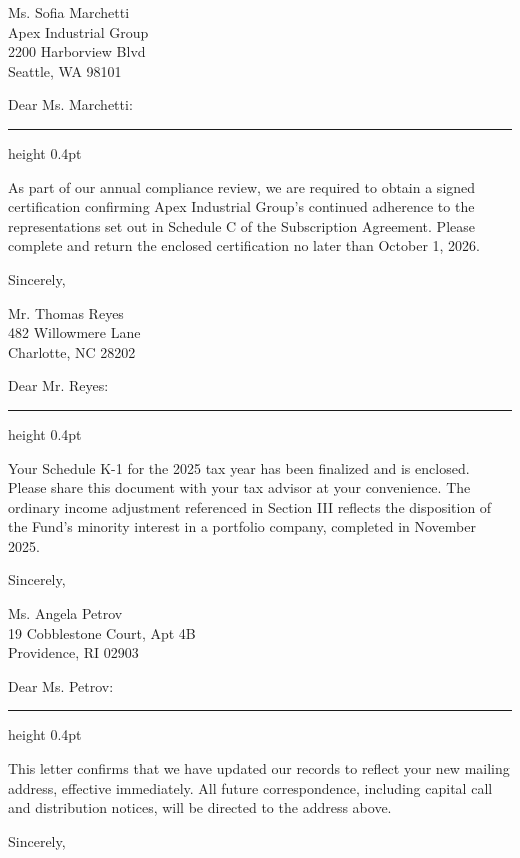 \documentclass[11pt]{letter}
\begin{document}
\begin{letter}{Ms. Sofia Marchetti\\
  Apex Industrial Group\\
  2200 Harborview Blvd\\
  Seattle, WA 98101}

\opening{Dear Ms. Marchetti:}
\vspace{-0.4\baselineskip}
{\color{hairline}\hrule height 0.4pt}
\vspace{0.6\baselineskip}

As part of our annual compliance review, we are required to obtain a signed certification confirming Apex Industrial Group's continued adherence to the representations set out in Schedule C of the Subscription Agreement. Please complete and return the enclosed certification no later than October 1, 2026.

\closing{Sincerely,}
\end{letter}

\begin{letter}{Mr. Thomas Reyes\\
  482 Willowmere Lane\\
  Charlotte, NC 28202}

\opening{Dear Mr. Reyes:}
\vspace{-0.4\baselineskip}
{\color{hairline}\hrule height 0.4pt}
\vspace{0.6\baselineskip}

Your Schedule K-1 for the 2025 tax year has been finalized and is enclosed. Please share this document with your tax advisor at your convenience. The ordinary income adjustment referenced in Section III reflects the disposition of the Fund's minority interest in a portfolio company, completed in November 2025.

\closing{Sincerely,}
\end{letter}

\begin{letter}{Ms. Angela Petrov\\
  19 Cobblestone Court, Apt 4B\\
  Providence, RI 02903}

\opening{Dear Ms. Petrov:}
\vspace{-0.4\baselineskip}
{\color{hairline}\hrule height 0.4pt}
\vspace{0.6\baselineskip}

This letter confirms that we have updated our records to reflect your new mailing address, effective immediately. All future correspondence, including capital call and distribution notices, will be directed to the address above.

\closing{Sincerely,}
\end{letter}
\end{document}
